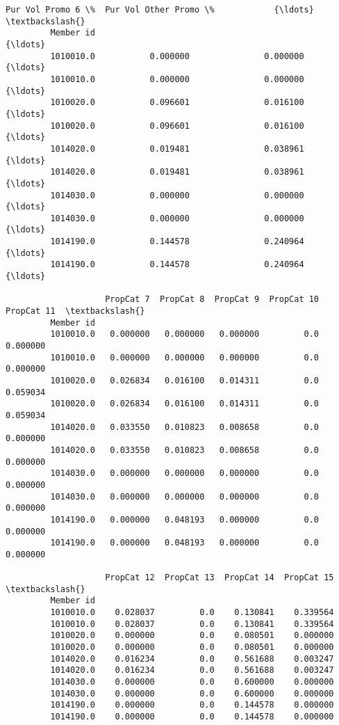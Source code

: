\documentclass[11pt]{article}
\begin{document}
\begin{Verbatim}[commandchars=\\\{\}]
                    Pur Vol Promo 6 \%  Pur Vol Other Promo \%            {\ldots}             \textbackslash{}
         Member id                                                      {\ldots}              
         1010010.0           0.000000               0.000000            {\ldots}              
         1010010.0           0.000000               0.000000            {\ldots}              
         1010020.0           0.096601               0.016100            {\ldots}              
         1010020.0           0.096601               0.016100            {\ldots}              
         1014020.0           0.019481               0.038961            {\ldots}              
         1014020.0           0.019481               0.038961            {\ldots}              
         1014030.0           0.000000               0.000000            {\ldots}              
         1014030.0           0.000000               0.000000            {\ldots}              
         1014190.0           0.144578               0.240964            {\ldots}              
         1014190.0           0.144578               0.240964            {\ldots}              
         
                    PropCat 7  PropCat 8  PropCat 9  PropCat 10  PropCat 11  \textbackslash{}
         Member id                                                            
         1010010.0   0.000000   0.000000   0.000000         0.0    0.000000   
         1010010.0   0.000000   0.000000   0.000000         0.0    0.000000   
         1010020.0   0.026834   0.016100   0.014311         0.0    0.059034   
         1010020.0   0.026834   0.016100   0.014311         0.0    0.059034   
         1014020.0   0.033550   0.010823   0.008658         0.0    0.000000   
         1014020.0   0.033550   0.010823   0.008658         0.0    0.000000   
         1014030.0   0.000000   0.000000   0.000000         0.0    0.000000   
         1014030.0   0.000000   0.000000   0.000000         0.0    0.000000   
         1014190.0   0.000000   0.048193   0.000000         0.0    0.000000   
         1014190.0   0.000000   0.048193   0.000000         0.0    0.000000   
         
                    PropCat 12  PropCat 13  PropCat 14  PropCat 15  \textbackslash{}
         Member id                                                   
         1010010.0    0.028037         0.0    0.130841    0.339564   
         1010010.0    0.028037         0.0    0.130841    0.339564   
         1010020.0    0.000000         0.0    0.080501    0.000000   
         1010020.0    0.000000         0.0    0.080501    0.000000   
         1014020.0    0.016234         0.0    0.561688    0.003247   
         1014020.0    0.016234         0.0    0.561688    0.003247   
         1014030.0    0.000000         0.0    0.600000    0.000000   
         1014030.0    0.000000         0.0    0.600000    0.000000   
         1014190.0    0.000000         0.0    0.144578    0.000000   
         1014190.0    0.000000         0.0    0.144578    0.000000   
         

\end{Verbatim}
\end{document}
